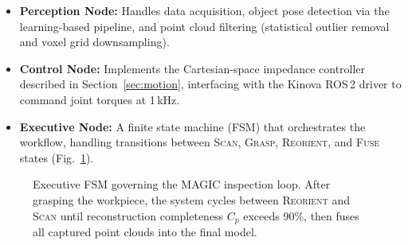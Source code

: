 \documentclass[letterpaper, 10 pt, conference]{ieeeconf}  %
\begin{document}
\begin{itemize}
    \item \textbf{Perception Node:} Handles data acquisition, object pose
    detection via the learning-based pipeline, and point cloud filtering
    (statistical outlier removal and voxel grid downsampling).

    \item \textbf{Control Node:} Implements the Cartesian-space impedance
    controller described in Section~\ref{sec:motion}, interfacing with the
    Kinova ROS\,2 driver to command joint torques at 1\,kHz.

    \item \textbf{Executive Node:} A finite state machine (FSM) that
    orchestrates the workflow, handling transitions between \textsc{Scan},
    \textsc{Grasp}, \textsc{Reorient}, and \textsc{Fuse} states
    (Fig.~\ref{fig:fsm}).
\end{itemize}

\begin{figure}[thpb]
  \centering
  \caption{Executive FSM governing the MAGIC inspection loop. After grasping the
           workpiece, the system cycles between \textsc{Reorient} and \textsc{Scan}
           until reconstruction completeness $C_p$ exceeds 90\%, then fuses all
           captured point clouds into the final model.}
  \label{fig:fsm}
\end{figure}
\end{document}
